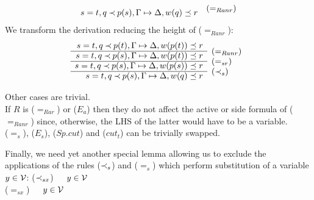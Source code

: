 \begin{PROOF}
\begin{LS}
\[\begin{array}{rl}
s=t, q\Incl p(s), \GSD, w(q)\preceq r & \rabove{(=_{Ranr})} \end{array} \]
We transform the derivation reducing the height of ($=_{Ranr}$):
\[ \begin{array}{rl}
s=t, q\Incl p(t), \GSD, w(p(t))\preceq r \\ \cline{1-1}
s=t, q\Incl p(s), \GSD, w(p(t))\preceq r & \rabove{(=_{Ranr})} \\ \cline{1-1}
s=t, q\Incl p(s), \GSD, w(p(s))\preceq r & \rabove{(=_{sr})} \\ \cline{1-1}
s=t, q\Incl p(s), \GSD, w(q)\preceq r & \rabove{(\Incl_s)} \end{array} \]
%
\item Other cases are trivial. \\
If $R$ is ($=_{Rar}$) or ($E_a$) then they do not affect the active or side
formula of ($=_{Ranr}$) since, otherwise, the LHS of the latter would have to
be a variable. \\
 ($=_s$), ($E_s$), ($Sp.cut$) and ($cut_t$) can be trivially swapped.
\end{LS}
\end{PROOF}

Finally, we need yet another special lemma allowing us to exclude the 
applications of the rules ($\mathbin{\prec}_s$) and ($=_s$) which perform substitution of a variable $y\in{\cal V}$:
\label{ru:inclsx} ($\mathbin{\prec}_{sx}$)\ \
\ $y\in{\cal V}$ \\
\label{ru:eqsx} ($=_{sx}$)\ \
\ $y\in{\cal V}$

